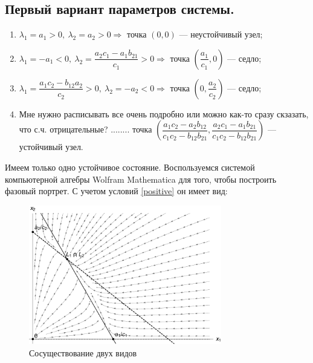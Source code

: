 \documentclass[12pt,a4paper]{article}
\begin{document}
    \subsection{Первый вариант параметров системы.}
    \begin{enumerate}
        \setlength\itemsep{0.5em}
        \item $ \lambda_1 = a_1 > 0,\ \lambda_2 = a_2 > 0 \Rightarrow $ точка $ (0, 0) $ --- неустойчивый узел;
    
        \item $ \lambda_1 = -a_1 < 0,\ \lambda_2 = \dfrac{a_2 c_1 - a_1 b_{21}}{c_1} > 0 \Rightarrow $ точка $ \left( \dfrac{a_1}{c_1}, 0 \right) $ --- седло;
        
        \item  $ \lambda_1 = \dfrac{a_1 c_2 - b_{12} a_2}{c_2} > 0,\ \lambda_2 = -a_2 < 0 \Rightarrow $ точка $ \left( 0, \dfrac{a_2}{c_2} \right) $ --- седло;
        
        \item Мне нужно расписывать все очень подробно или можно как-то сразу скзазать, что с.ч. отрицательные? ........ точка $ \left( \dfrac{a_1 c_2 - a_2 b_{12}}{c_1 c_2 - b_{12} b_{21}}, \dfrac{a_2 c_1 - a_1 b_{21}}{c_1 c_2 - b_{12} b_{21}} \right) $ --- устойчивый узел.
        \\
    \end{enumerate}

    Имеем только одно устойчивое состояние. Воспользуемся системой компьютерной алгебры Wolfram Mathematica для того, чтобы построить фазовый портрет. С учетом условий \eqref{positive} он имеет вид:
    \begin{figure}[h]
        \centering
        \includegraphics[width=0.75\textwidth]{phase_1.pdf}
        \caption{Сосуществование двух видов}
        \label{fig:phase_1}
    \end{figure}
\end{document}
